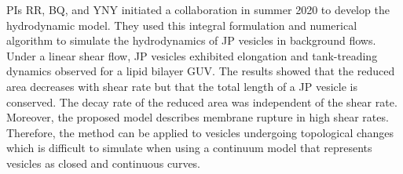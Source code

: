 


%
%

%



PIs RR, BQ, and YNY initiated a collaboration in summer 2020 to develop
the hydrodynamic model.
They  used this integral formulation and numerical
algorithm to simulate the hydrodynamics of JP vesicles in background
flows. Under a linear shear flow, JP vesicles exhibited
elongation and tank-treading dynamics observed for a lipid bilayer GUV.
%
%
The results showed that the reduced area decreases with shear rate
but that the total length of a JP vesicle is conserved. The decay rate
of the reduced area was independent of the shear rate.
Moreover, the proposed model
describes membrane rupture in high shear rates. Therefore, the method
can be applied to vesicles undergoing topological changes which is
difficult to simulate when using a continuum model that represents
vesicles as closed and continuous curves.
%
%

